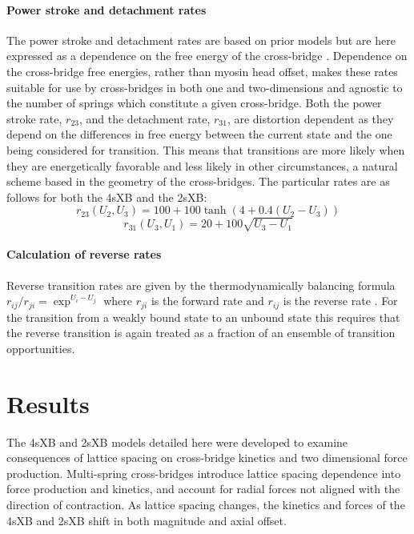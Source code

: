\documentclass[]{article}
\begin{document}
\paragraph{Power stroke and detachment rates} %
The power stroke and detachment rates are based on prior models but are here expressed as a dependence on the free energy of the cross-bridge \citep{Pate1989, Tanner2007}.
Dependence on the cross-bridge free energies, rather than myosin head offset, makes these rates suitable for use by cross-bridges in both one and two-dimensions and agnostic to the number of springs which constitute a given cross-bridge. 
Both the power stroke rate, $r_{23}$, and the detachment rate, $r_{31}$, are distortion dependent as they depend on the differences in free energy between the current state and the one being considered for transition. 
This means that transitions are more likely when they are energetically favorable and less likely in other circumstances, a natural scheme based in the geometry of the cross-bridges.
The particular rates are as follows for both the 4sXB and the 2sXB: 
$$r_{23}(U_2, U_3) = 100 + 100\tanh(4 + 0.4 (U_2 - U_3)) $$
$$r_{31}(U_3, U_1) = 20 + 100 \sqrt{U_3 - U_1} $$

\paragraph{Calculation of reverse rates} %
Reverse transition rates are given by the thermodynamically balancing formula $r_{ij}/r_{ji}=\exp^{U_i-U_j}$ where $r_{ji}$ is the forward rate and $r_{ij}$ is the reverse rate \citep{Pate1989, Daniel1998, Tanner2007}.
For the transition from a weakly bound state to an unbound state this requires that the reverse transition is again treated as a fraction of an ensemble of transition opportunities. 



\section*{Results} %

The 4sXB and 2sXB models detailed here were developed to examine consequences of lattice spacing on cross-bridge kinetics and two dimensional force production.
Multi-spring cross-bridges introduce lattice spacing dependence into force production and kinetics, and account for radial forces not aligned with the direction of contraction. 
As lattice spacing changes, the kinetics and forces of the 4sXB and 2sXB shift in both magnitude and axial offset.
\end{document}
